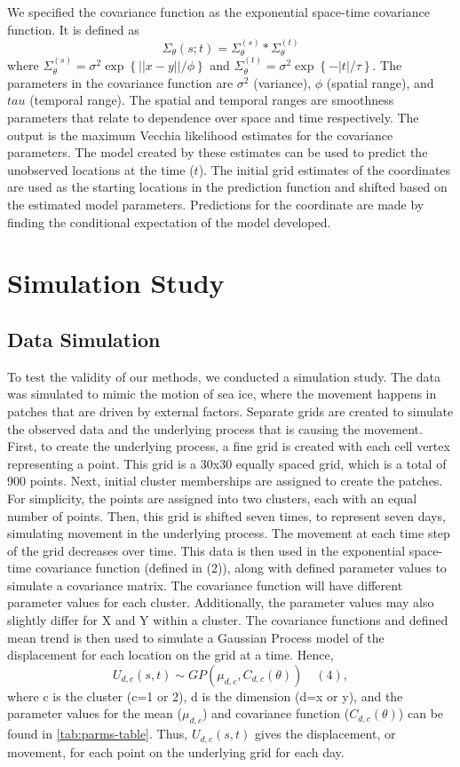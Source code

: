 \documentclass[12pt]{article}
\begin{document}
We specified the covariance function as the exponential space-time
covariance function. It is defined as
\[\Sigma_{\theta}(s;t) = \Sigma^{(s)}_{\theta}*\Sigma^{(t)}_{\theta}\]
where
\(\Sigma^{(s)}_{\theta} = \sigma^2\exp\left\{||x-y||/\phi\right\}\) and
\(\Sigma^{(t)}_{\theta} = \sigma^2\exp\left\{-|t|/\tau\right\}\). The
parameters in the covariance function are \(\sigma^2\) (variance),
\(\phi\) (spatial range), and \(tau\) (temporal range). The spatial and
temporal ranges are smoothness parameters that relate to dependence over
space and time respectively. The output is the maximum Vecchia
likelihood estimates for the covariance parameters. The model created by
these estimates can be used to predict the unobserved locations at the
time (\(t\)). The initial grid estimates of the coordinates are used as
the starting locations in the prediction function and shifted based on
the estimated model parameters. Predictions for the coordinate are made
by finding the conditional expectation of the model developed.

\hypertarget{simulation}{%
\section{Simulation Study}\label{simulation}}

\hypertarget{data-simulation}{%
\subsection{Data Simulation}\label{data-simulation}}

To test the validity of our methods, we conducted a simulation study.
The data was simulated to mimic the motion of sea ice, where the
movement happens in patches that are driven by external factors.
Separate grids are created to simulate the observed data and the
underlying process that is causing the movement. First, to create the
underlying process, a fine grid is created with each cell vertex
representing a point. This grid is a 30x30 equally spaced grid, which is
a total of 900 points. Next, initial cluster memberships are assigned to
create the patches. For simplicity, the points are assigned into two
clusters, each with an equal number of points. Then, this grid is
shifted seven times, to represent seven days, simulating movement in the
underlying process. The movement at each time step of the grid decreases
over time. This data is then used in the exponential space-time
covariance function (defined in (2)), along with defined parameter
values to simulate a covariance matrix. The covariance function will
have different parameter values for each cluster. Additionally, the
parameter values may also slightly differ for X and Y within a cluster.
The covariance functions and defined mean trend is then used to simulate
a Gaussian Process model of the displacement for each location on the
grid at a time.
Hence,\[ U_{d,c}(s,t) \sim GP(\mu_{d,c}, C_{d,c}(\theta)) \quad (4),\]
where c is the cluster (c=1 or 2), d is the dimension (d=x or y), and
the parameter values for the mean (\(\mu_{d,c}\)) and covariance
function (\(C_{d,c}(\theta)\)) can be found in \cref{tab:parms-table}.
Thus, \(U_{d,c}(s,t)\) gives the displacement, or movement, for each
point on the underlying grid for each day.
\end{document}
